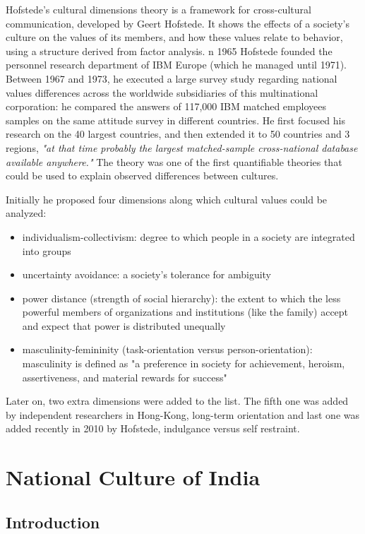\documentclass{article}
\begin{document}
Hofstede's cultural dimensions theory \cite{ref:Hofstede's cultural dimensions theory} is a framework for cross-cultural communication, developed by Geert Hofstede. It shows the effects of a society's culture on the values of its members, and how these values relate to behavior, using a structure derived from factor analysis. n 1965 Hofstede founded the personnel research department of IBM Europe (which he managed until 1971). Between 1967 and 1973, he executed a large survey study regarding national values differences across the worldwide subsidiaries of this multinational corporation: he compared the answers of 117,000 IBM matched employees samples on the same attitude survey in different countries. He first focused his research on the 40 largest countries, and then extended it to 50 countries and 3 regions, \textit{"at that time probably the largest matched-sample cross-national database available anywhere."} The theory was one of the first quantifiable theories that could be used to explain observed differences between cultures.

Initially he proposed four dimensions along which cultural values could be analyzed: 
\begin{itemize}
    \item individualism-collectivism: degree to which people in a society are integrated into groups
    \item uncertainty avoidance: a society's tolerance for ambiguity
    \item power distance (strength of social hierarchy): the extent to which the less powerful members of organizations and institutions (like the family) accept and expect that power is distributed unequally
    \item masculinity-femininity (task-orientation versus person-orientation): masculinity is defined as "a preference in society for achievement, heroism, assertiveness, and material rewards for success"
\end{itemize}
Later on, two extra dimensions were added to the list. The fifth one was added by independent researchers in Hong-Kong, long-term orientation and last one was added recently in 2010 by Hofstede, indulgance versus self restraint.

\section{National Culture of India}

\subsection{Introduction}
\end{document}
